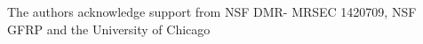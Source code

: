 \documentclass[amsmath,preprintnumbers,10pt,nofootinbib,prl,twocolumn]{revtex4-1}
\begin{document}
The authors acknowledge support from NSF DMR-
MRSEC  1420709, NSF GFRP and the  University  of  Chicago
 

\end{document}
